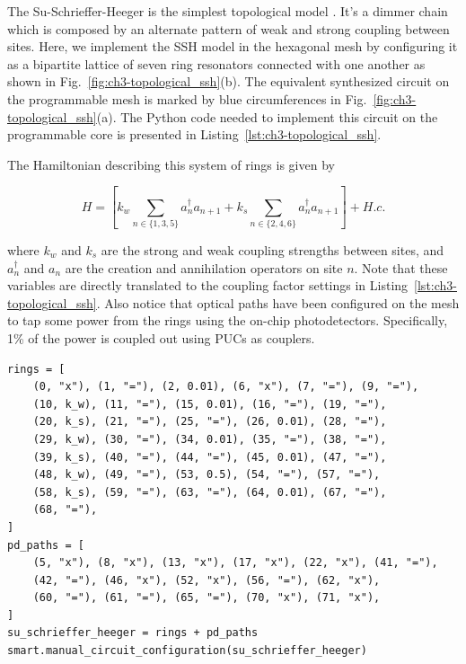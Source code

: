 The Su-Schrieffer-Heeger is the simplest topological model \cite{su_solitons_1979}.
It's a dimmer chain which is composed by an alternate pattern of weak and strong coupling between sites.
Here, we implement the SSH model in the hexagonal mesh by configuring it as a bipartite lattice of seven ring resonators connected with one another as shown in Fig.~\ref{fig:ch3-topological_ssh}(b).
The equivalent synthesized circuit on the programmable mesh is marked by blue circumferences in Fig.~\ref{fig:ch3-topological_ssh}(a).
The Python code needed to implement this circuit on the programmable core is presented in Listing~\ref{lst:ch3-topological_ssh}.

The Hamiltonian describing this system of rings is given by

\begin{equation}
	H = \left[ k_w \sum_{n \in \{1,3,5\}} a_n^\dagger a_{n+1} + k_s \sum_{n \in \{2,4,6\}} a_n^\dagger a_{n+1} \right] + H.c.
	\label{eq:ch3-topological_ssh}
\end{equation}

where $k_w$ and $k_s$ are the strong and weak coupling strengths between sites, and $a_n^\dagger$ and $a_n$ are the creation and annihilation operators on site $n$.
Note that these variables are directly translated to the coupling factor settings in Listing~\ref{lst:ch3-topological_ssh}.
Also notice that optical paths have been configured on the mesh to tap some power from the rings using the on-chip photodetectors.
Specifically, 1\% of the power is coupled out using PUCs as couplers.

\begin{lstlisting}[caption={Implementation of the Su-Schrieffer-Heeger (SSH) model using the first-generation Smartlight API}, label=lst:ch3-topological_ssh]
rings = [ 
    (0, "x"), (1, "="), (2, 0.01), (6, "x"), (7, "="), (9, "="),
    (10, k_w), (11, "="), (15, 0.01), (16, "="), (19, "="),
    (20, k_s), (21, "="), (25, "="), (26, 0.01), (28, "="),
    (29, k_w), (30, "="), (34, 0.01), (35, "="), (38, "="),
    (39, k_s), (40, "="), (44, "="), (45, 0.01), (47, "="),
    (48, k_w), (49, "="), (53, 0.5), (54, "="), (57, "="),
    (58, k_s), (59, "="), (63, "="), (64, 0.01), (67, "="),
    (68, "="),
]
pd_paths = [
    (5, "x"), (8, "x"), (13, "x"), (17, "x"), (22, "x"), (41, "="),
    (42, "="), (46, "x"), (52, "x"), (56, "="), (62, "x"),
    (60, "="), (61, "="), (65, "="), (70, "x"), (71, "x"),
]
su_schrieffer_heeger = rings + pd_paths
smart.manual_circuit_configuration(su_schrieffer_heeger)
\end{lstlisting}

